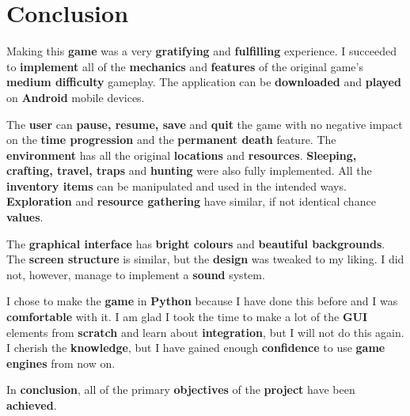 \chapter*{Conclusion}
	\par Making this \textbf{game} was a very \textbf{gratifying} and \textbf{fulfilling} experience. I succeeded to \textbf{implement} all of the \textbf{mechanics} and \textbf{features} of the original game's \textbf{medium difficulty} gameplay. The application can be \textbf{downloaded} and \textbf{played} on \textbf{Android }mobile devices. 
	\par The \textbf{user} can \textbf{pause, resume, save} and \textbf{quit} the game with no negative impact on the \textbf{time progression} and the \textbf{permanent death} feature. The \textbf{environment} has all the original \textbf{locations} and \textbf{resources}. \textbf{Sleeping, crafting, travel, traps} and \textbf{hunting} were also fully implemented. All the \textbf{inventory items} can be manipulated and used in the intended ways. \textbf{Exploration} and \textbf{resource gathering} have similar, if not identical chance \textbf{values}. 
	\par The \textbf{graphical interface} has \textbf{bright colours} and \textbf{beautiful backgrounds}. The \textbf{screen structure} is similar, but the \textbf{design} was tweaked to my liking. I did not, however, manage to implement a \textbf{sound} system.
	\par I chose to make the \textbf{game} in \textbf{Python} because I have done this before and I was \textbf{comfortable} with it. I am glad I took the time to make a lot of the \textbf{GUI} elements from \textbf{scratch} and learn about \textbf{integration}, but I will not do this again. I cherish the \textbf{knowledge}, but I have gained enough \textbf{confidence} to use \textbf{game engines} from now on.
	\par In \textbf{conclusion}, all of the primary \textbf{objectives} of the \textbf{project} have been \textbf{achieved}.
\newpage